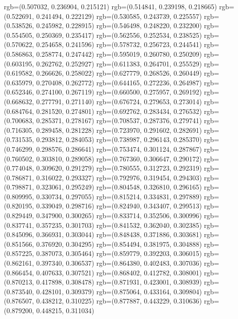 {{{					rgb=(0.507032, 0.236904, 0.215121)
					rgb=(0.514841, 0.239198, 0.218665)
					rgb=(0.522691, 0.241494, 0.222129)
					rgb=(0.530585, 0.243739, 0.225557)
					rgb=(0.538526, 0.245982, 0.228915)
					rgb=(0.546498, 0.248220, 0.232200)
					rgb=(0.554505, 0.250369, 0.235417)
					rgb=(0.562556, 0.252534, 0.238525)
					rgb=(0.570622, 0.254658, 0.241596)
					rgb=(0.578732, 0.256723, 0.244541)
					rgb=(0.586863, 0.258774, 0.247442)
					rgb=(0.595019, 0.260780, 0.250209)
					rgb=(0.603195, 0.262762, 0.252927)
					rgb=(0.611383, 0.264701, 0.255529)
					rgb=(0.619582, 0.266626, 0.258022)
					rgb=(0.627779, 0.268526, 0.260449)
					rgb=(0.635979, 0.270408, 0.262772)
					rgb=(0.644165, 0.272236, 0.264987)
					rgb=(0.652346, 0.274100, 0.267119)
					rgb=(0.660500, 0.275957, 0.269192)
					rgb=(0.668632, 0.277791, 0.271140)
					rgb=(0.676724, 0.279653, 0.273014)
					rgb=(0.684764, 0.281520, 0.274801)
					rgb=(0.692762, 0.283434, 0.276532)
					rgb=(0.700683, 0.285371, 0.278167)
					rgb=(0.708537, 0.287376, 0.279741)
					rgb=(0.716305, 0.289458, 0.281228)
					rgb=(0.723970, 0.291602, 0.282691)
					rgb=(0.731535, 0.293812, 0.284053)
					rgb=(0.738987, 0.296143, 0.285370)
					rgb=(0.746299, 0.298576, 0.286641)
					rgb=(0.753474, 0.301124, 0.287867)
					rgb=(0.760502, 0.303810, 0.289058)
					rgb=(0.767360, 0.306647, 0.290172)
					rgb=(0.774048, 0.309620, 0.291279)
					rgb=(0.780555, 0.312723, 0.292319)
					rgb=(0.786871, 0.316022, 0.293327)
					rgb=(0.792976, 0.319454, 0.294303)
					rgb=(0.798871, 0.323061, 0.295249)
					rgb=(0.804548, 0.326810, 0.296165)
					rgb=(0.809995, 0.330734, 0.297055)
					rgb=(0.815214, 0.334831, 0.297889)
					rgb=(0.820195, 0.339049, 0.298716)
					rgb=(0.824940, 0.343407, 0.299513)
					rgb=(0.829449, 0.347900, 0.300265)
					rgb=(0.833714, 0.352506, 0.300996)
					rgb=(0.837741, 0.357235, 0.301703)
					rgb=(0.841532, 0.362040, 0.302385)
					rgb=(0.845096, 0.366931, 0.303044)
					rgb=(0.848438, 0.371886, 0.303681)
					rgb=(0.851566, 0.376920, 0.304295)
					rgb=(0.854494, 0.381975, 0.304888)
					rgb=(0.857225, 0.387073, 0.305464)
					rgb=(0.859779, 0.392203, 0.306015)
					rgb=(0.862161, 0.397340, 0.306537)
					rgb=(0.864380, 0.402483, 0.307036)
					rgb=(0.866454, 0.407633, 0.307521)
					rgb=(0.868402, 0.412782, 0.308001)
					rgb=(0.870213, 0.417898, 0.308478)
					rgb=(0.871931, 0.423001, 0.308939)
					rgb=(0.873540, 0.428101, 0.309379)
					rgb=(0.875064, 0.433164, 0.309804)
					rgb=(0.876507, 0.438212, 0.310225)
					rgb=(0.877887, 0.443229, 0.310636)
					rgb=(0.879200, 0.448215, 0.311034)
}}}

